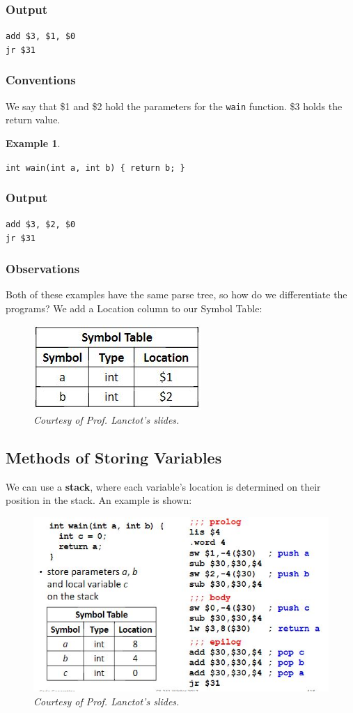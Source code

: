 \documentclass{report}
\newtheorem{ex}{Example}[section]
\begin{document}
\subsubsection{Output}
\texttt{add \$3, \$1, \$0}\\
\texttt{jr \$31}
\subsubsection{Conventions}
We say that \$1 and \$2 hold the parameters for the \texttt{wain} function. \$3 holds the return value.
\begin{ex}
\end{ex}
\noindent \texttt{int wain(int a, int b) \{ return b; \}}
\subsubsection{Output}
\texttt{add \$3, \$2, \$0}\\
\texttt{jr \$31}
\subsubsection{Observations}
Both of these examples have the same parse tree, so how do we differentiate the programs? We add a Location column to our Symbol Table:
\begin{figure}[ht]
\begin{center}
\includegraphics[scale=0.6]{symb.jpg}
\end{center}
\caption{\textit{Courtesy of Prof. Lanctot's slides.}}
\end{figure}
\subsection{Methods of Storing Variables}
We can use a \textbf{stack}, where each variable's location is determined on their position in the stack. An example is shown:
\begin{figure}[ht]
\begin{center}
\includegraphics[scale=0.6]{stack.jpg}
\end{center}
\caption{\textit{Courtesy of Prof. Lanctot's slides.}}
\end{figure}
\end{document}
